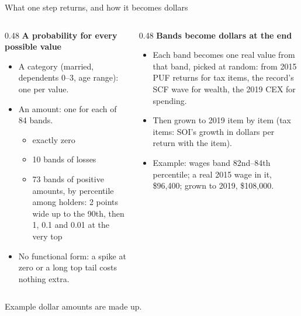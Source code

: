\documentclass[11pt,aspectratio=169]{beamer}
\newcommand{\slidenote}[1]{\par\vfill{\scriptsize\color{yalegrey}#1}}
\begin{document}
\begin{frame}{What one step returns, and how it becomes dollars}
  \begin{columns}[T]
    \begin{column}{0.48\textwidth}
      \textbf{\color{yaleblue}A probability for every possible value}
      \small
      \begin{itemize}\setlength{\itemsep}{3pt}
        \item A category (married, dependents 0--3, age range): one per value.
        \item An amount: one for each of 84 bands.
        \begin{itemize}
          \item exactly zero
          \item 10 bands of losses
          \item 73 bands of positive amounts, by percentile among holders: 2 points wide up
                to the 90th, then 1, 0.1 and 0.01 at the very top
        \end{itemize}
        \item No functional form: a spike at zero or a long top tail costs nothing extra.
      \end{itemize}
    \end{column}
    \begin{column}{0.48\textwidth}
      \textbf{\color{yaleblue}Bands become dollars at the end}
      \small
      \begin{itemize}\setlength{\itemsep}{3pt}
        \item Each band becomes one real value from that band, picked at random: from 2015
              PUF returns for tax items, the record's SCF wave for wealth, the 2019 CEX for spending.
        \item Then grown to 2019 item by item (tax items: SOI's growth in dollars per return
              with the item).
        \item Example: wages band 82nd--84th percentile; a real 2015 wage in it, \$96,400;
              grown to 2019, \$108,000.
      \end{itemize}
    \end{column}
  \end{columns}
  \slidenote{Example dollar amounts are made up.}
\end{frame}
\end{document}
